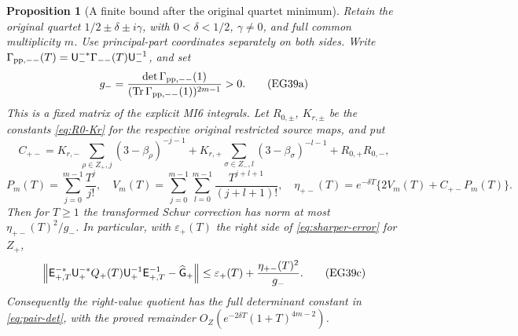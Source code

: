 \documentclass[11pt]{article}
\newtheorem{proposition}[theorem]{Proposition}
\newcommand{\U}{\mathsf U}\newcommand{\E}{\mathsf E}
\begin{document}
\begin{proposition}[A finite bound after the original quartet minimum]
\label{prop:quartet-bound}
Retain the original quartet $1/2\pm\delta\pm i\gamma$, with
$0<\delta<1/2$, $\gamma\ne0$, and full common multiplicity $m$.
Use principal-part coordinates separately on both sides. Write
$\Gamma_{\rm pp,--}(T)=\U_-^{-*}\Gamma_{--}(T)\U_-^{-1}$, and set
\[
 g_- =\frac{\det\Gamma_{\rm pp,--}(1)}
              {(\operatorname{Tr}\Gamma_{\rm pp,--}(1))^{2m-1}}>0.
 \tag{EG39a}\label{eq:left-fixed-bound}
\]
This is a fixed matrix of the explicit MI6 integrals. Let $R_{0,\pm}$,
$K_{r,\pm}$ be the constants \eqref{eq:R0-Kr} for the respective
original restricted source maps, and put
\[
 C_{+-}=K_{r,-}\sum_{\rho\in Z_+,j}(3-\beta_\rho)^{-j-1}
       +K_{r,+}\sum_{\sigma\in Z_-,l}(3-\beta_\sigma)^{-l-1}
       +R_{0,+}R_{0,-},
\]
\[
 P_m(T)=\sum_{j=0}^{m-1}\frac{T^j}{j!},\quad
 V_m(T)=\sum_{j=0}^{m-1}\sum_{l=0}^{m-1}
                          \frac{T^{j+l+1}}{(j+l+1)!},\quad
 \eta_{+-}(T)=e^{-\delta T}\{2V_m(T)+C_{+-}P_m(T)\}.
 \tag{EG39b}\label{eq:cross-finite-bound}
\]
Then for $T\ge1$ the transformed Schur correction has norm at most
$\eta_{+-}(T)^2/g_-$. In particular, with $\varepsilon_+(T)$ the
right side of \eqref{eq:sharper-error} for $Z_+$,
\[
 \left\|\E_{+,T}^{-*}\U_+^{-*}Q_+(T)\U_+^{-1}\E_{+,T}^{-1}
                    -\widehat\G_+\right\|
 \le\varepsilon_+(T)+\frac{\eta_{+-}(T)^2}{g_-}.
 \tag{EG39c}\label{eq:quotient-finite-bound}
\]
Consequently the right-value quotient has the full determinant
constant in \eqref{eq:pair-det}, with the proved remainder
$O_Z(e^{-2\delta T}(1+T)^{4m-2})$.
\end{proposition}
\end{document}
